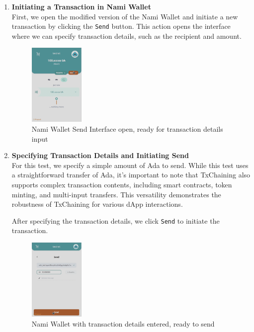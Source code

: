 \documentclass[11pt]{article}
\begin{document}
\begin{enumerate}
    \item \textbf{Initiating a Transaction in Nami Wallet}\\
    First, we open the modified version of the Nami Wallet and initiate a new transaction by clicking the \texttt{Send} button. This action opens the interface where we can specify transaction details, such as the recipient and amount. 
    \newline
    \begin{figure}[ht]
        \centering
        \includegraphics[width=100px]{./imgs/fe1}
        \caption{Nami Wallet Send Interface open, ready for transaction details input}
    \end{figure}
    
    \item \textbf{Specifying Transaction Details and Initiating Send}\\
    For this test, we specify a simple amount of Ada to send. While this test uses a straightforward transfer of Ada, it’s important to note that TxChaining also supports complex transaction contents, including smart contracts, token minting, and multi-input transfers. This versatility demonstrates the robustness of TxChaining for various dApp interactions.
    
    After specifying the transaction details, we click \texttt{Send} to initiate the transaction.
    \newline
    \begin{figure}[ht]
        \centering
        \includegraphics[width=100px]{./imgs/fe2}
        \caption{Nami Wallet with transaction details entered, ready to send}
    \end{figure}
    

\end{enumerate}
\end{document}
